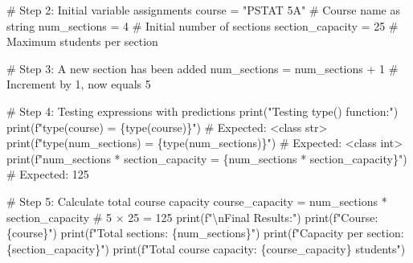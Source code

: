 \documentclass[
  11pt,
]{article}
\newenvironment{Shaded}{\begin{snugshade}}{\end{snugshade}}
\newcommand{\BuiltInTok}[1]{\textcolor[rgb]{0.00,0.23,0.31}{#1}}
\newcommand{\CharTok}[1]{\textcolor[rgb]{0.13,0.47,0.30}{#1}}
\newcommand{\CommentTok}[1]{\textcolor[rgb]{0.37,0.37,0.37}{#1}}
\newcommand{\DecValTok}[1]{\textcolor[rgb]{0.68,0.00,0.00}{#1}}
\newcommand{\NormalTok}[1]{\textcolor[rgb]{0.00,0.23,0.31}{#1}}
\newcommand{\OperatorTok}[1]{\textcolor[rgb]{0.37,0.37,0.37}{#1}}
\newcommand{\SpecialCharTok}[1]{\textcolor[rgb]{0.37,0.37,0.37}{#1}}
\newcommand{\SpecialStringTok}[1]{\textcolor[rgb]{0.13,0.47,0.30}{#1}}
\newcommand{\StringTok}[1]{\textcolor[rgb]{0.13,0.47,0.30}{#1}}
\begin{document}
\begin{Shaded}
\begin{Highlighting}[]
\CommentTok{\# Step 2: Initial variable assignments}
\NormalTok{course }\OperatorTok{=} \StringTok{"PSTAT 5A"}          \CommentTok{\# Course name as string}
\NormalTok{num\_sections }\OperatorTok{=} \DecValTok{4}             \CommentTok{\# Initial number of sections}
\NormalTok{section\_capacity }\OperatorTok{=} \DecValTok{25}        \CommentTok{\# Maximum students per section}

\CommentTok{\# Step 3: A new section has been added}
\NormalTok{num\_sections }\OperatorTok{=}\NormalTok{ num\_sections }\OperatorTok{+} \DecValTok{1}  \CommentTok{\# Increment by 1, now equals 5}

\CommentTok{\# Step 4: Testing expressions with predictions}
\BuiltInTok{print}\NormalTok{(}\StringTok{"Testing type() function:"}\NormalTok{)}
\BuiltInTok{print}\NormalTok{(}\SpecialStringTok{f"type(course) = }\SpecialCharTok{\{}\BuiltInTok{type}\NormalTok{(course)}\SpecialCharTok{\}}\SpecialStringTok{"}\NormalTok{)  }\CommentTok{\# Expected: \textless{}class \textquotesingle{}str\textquotesingle{}\textgreater{}}
\BuiltInTok{print}\NormalTok{(}\SpecialStringTok{f"type(num\_sections) = }\SpecialCharTok{\{}\BuiltInTok{type}\NormalTok{(num\_sections)}\SpecialCharTok{\}}\SpecialStringTok{"}\NormalTok{)  }\CommentTok{\# Expected: \textless{}class \textquotesingle{}int\textquotesingle{}\textgreater{}}
\BuiltInTok{print}\NormalTok{(}\SpecialStringTok{f"num\_sections * section\_capacity = }\SpecialCharTok{\{}\NormalTok{num\_sections }\OperatorTok{*}\NormalTok{ section\_capacity}\SpecialCharTok{\}}\SpecialStringTok{"}\NormalTok{)  }\CommentTok{\# Expected: 125}

\CommentTok{\# Step 5: Calculate total course capacity}
\NormalTok{course\_capacity }\OperatorTok{=}\NormalTok{ num\_sections }\OperatorTok{*}\NormalTok{ section\_capacity  }\CommentTok{\# 5 × 25 = 125}
\BuiltInTok{print}\NormalTok{(}\SpecialStringTok{f"}\CharTok{\textbackslash{}n}\SpecialStringTok{Final Results:"}\NormalTok{)}
\BuiltInTok{print}\NormalTok{(}\SpecialStringTok{f"Course: }\SpecialCharTok{\{}\NormalTok{course}\SpecialCharTok{\}}\SpecialStringTok{"}\NormalTok{)}
\BuiltInTok{print}\NormalTok{(}\SpecialStringTok{f"Total sections: }\SpecialCharTok{\{}\NormalTok{num\_sections}\SpecialCharTok{\}}\SpecialStringTok{"}\NormalTok{)}
\BuiltInTok{print}\NormalTok{(}\SpecialStringTok{f"Capacity per section: }\SpecialCharTok{\{}\NormalTok{section\_capacity}\SpecialCharTok{\}}\SpecialStringTok{"}\NormalTok{)}
\BuiltInTok{print}\NormalTok{(}\SpecialStringTok{f"Total course capacity: }\SpecialCharTok{\{}\NormalTok{course\_capacity}\SpecialCharTok{\}}\SpecialStringTok{ students"}\NormalTok{)}
\end{Highlighting}
\end{Shaded}
\end{document}
